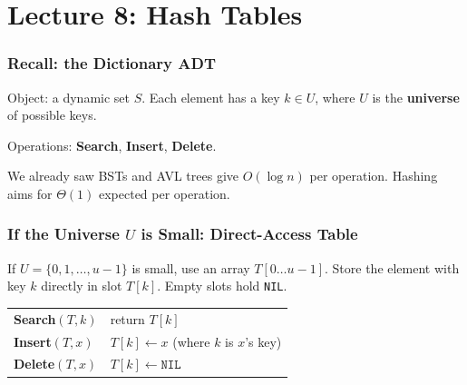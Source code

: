 \documentclass[11pt]{article}
\begin{document}
\newpage


\part*{\textcolor{utnavy}{Lecture 8: Hash Tables}}

\section{Recall: the Dictionary ADT}

\begin{defbox}
Object: a dynamic set $S$. Each element has a \textcolor{rustW}{key} $k \in U$, where $U$ is the \textbf{universe} of possible keys.

Operations: \textcolor{heapblue}{\textbf{Search}}, \textcolor{heapblue}{\textbf{Insert}}, \textcolor{heapblue}{\textbf{Delete}}.
\end{defbox}

We already saw BSTs and AVL trees give $O(\log n)$ per operation. Hashing aims for \textcolor{greenO}{$\Theta(1)$ expected} per operation.

\section{If the Universe $U$ is Small: Direct-Access Table}

\begin{defbox}
If $U = \{0, 1, \ldots, u-1\}$ is small, use an array $T[0 \ldots u-1]$. Store the element with key $k$ directly in slot $T[k]$. Empty slots hold \texttt{NIL}.
\end{defbox}

\begin{keybox}
\renewcommand{\arraystretch}{1.4}
\begin{tabular}{l l}
\textcolor{heapblue}{\textbf{Search}$(T, k)$} & return $T[k]$ \\
\textcolor{heapblue}{\textbf{Insert}$(T, x)$} & $T[k] \leftarrow x$ \quad (where $k$ is $x$'s key) \\
\textcolor{heapblue}{\textbf{Delete}$(T, x)$} & $T[k] \leftarrow \texttt{NIL}$ \\
\end{tabular}
\end{keybox}
\end{document}
